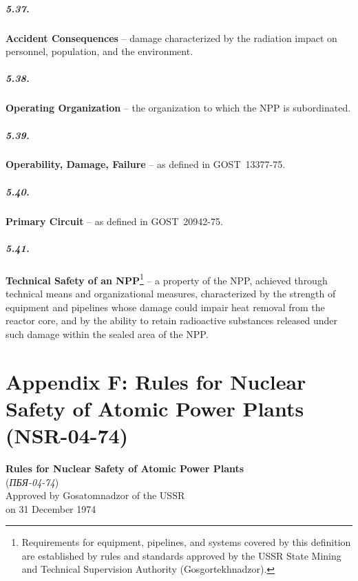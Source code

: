 \documentclass[openright]{bookest}
\begin{document}
\paragraph{5.37.}
\textbf{Accident Consequences} -- damage characterized by the radiation impact on personnel, population, and the environment.

\paragraph{5.38.}
\textbf{Operating Organization} -- the organization to which the NPP is subordinated.

\paragraph{5.39.}
\textbf{Operability, Damage, Failure} -- as defined in GOST~13377-75.

\paragraph{5.40.}
\textbf{Primary Circuit} -- as defined in GOST~20942-75.

\paragraph{5.41.}
\textbf{Technical Safety of an NPP}\footnote{Requirements for equipment, pipelines, and systems covered by this definition are established by rules and standards approved by the USSR State Mining and Technical Supervision Authority (Gosgortekhnadzor).} -- a property of the NPP, achieved through technical means and organizational measures, characterized by the strength of equipment and pipelines whose damage could impair heat removal from the reactor core, and by the ability to retain radioactive substances released under such damage within the sealed area of the NPP.

\chapter*{Appendix F: Rules for Nuclear Safety of Atomic Power Plants (NSR-04-74)}

\begin{center}
\textbf{Rules for Nuclear Safety of Atomic Power Plants}\\
(\textit{ПБЯ-04-74})\\
Approved by Gosatomnadzor of the USSR\\
on 31 December 1974
\end{center}
\end{document}
